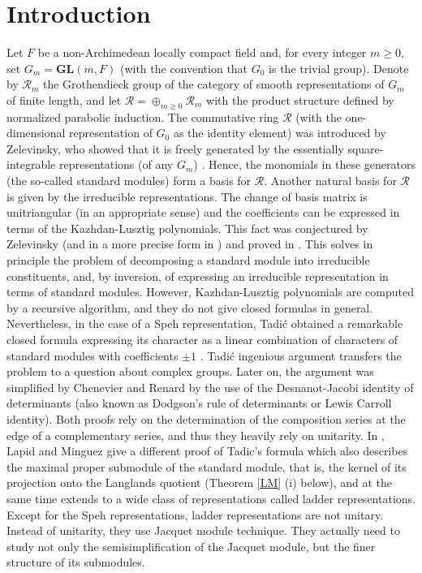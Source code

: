 \documentclass[a4paper,12pt,leqno]{amsart}
\newcommand{\caR}{\mathcal{R}}
\theoremstyle{plain}
\theoremstyle{definition}
\theoremstyle{definition}
\newcommand{\GL}{\mathbf{GL}}
\begin{document}
\section*{ Introduction}
Let $F$ be a non-Archimedean locally compact  field and, for every integer $m\geq0$, set $G_m=\GL(m,F)$
(with the convention that $G_0$  is the trivial group). Denote by $\caR_m$ the Grothendieck group
of the category of
 smooth representations of $G_m$  of  finite length, and let $\caR=\oplus_{m\geq 0}\caR_m$ with the
 product structure
 defined by normalized  parabolic induction. The commutative ring $\caR$  (with the one-dimensional
 representation
 of $G_0$ as the identity element) was introduced by Zelevinsky, who showed that it is freely generated by the
 essentially square-integrable representations   (of any $G_m$) \cite{Zel80}. Hence, the monomials in these
generators (the so-called standard modules) form a basis for   $\caR$. Another natural basis for $\caR$ is
given by the irreducible representations. The change of basis matrix is unitriangular (in an
appropriate sense)
 and the coefficients can be expressed in terms of the Kazhdan-Lusztig polynomials.
This fact was conjectured by Zelevinsky \cite{Zel81} (and in a more precise form in \cite{Zel85})
and proved in \cite{CG97}.
 This solves in principle the problem of decomposing a standard module into irreducible constituents, 
 and, by inversion, of expressing an irreducible representation in terms of standard modules.
 However, Kazhdan-Lusztig 
 polynomials are computed by a recursive algorithm, and they do not give closed formulas in
 general. Nevertheless, 
 in the case of a Speh representation, Tadi\'c obtained a remarkable closed  formula expressing its character 
 as a linear combination of characters of standard modules with coefficients $\pm1$  \cite{Tad95}.  
 Tadi\' c ingenious argument transfers the problem to a question about complex
 groups. Later on, the argument was  simplified by Chenevier and Renard \cite{CR08} by the use of
 the Desnanot-Jacobi
identity  of determinants (also known as Dodgson's rule of determinants or Lewis Carroll identity).
Both proofs rely on the
determination of the composition series at the edge of a complementary series, and thus they
heavily rely on unitarity.
In \cite{LM13}, Lapid and Minguez give a different proof of Tadic's formula
which also describes the maximal proper submodule of the standard module, that is, the kernel of
its projection onto the Langlands quotient (Theorem \ref{LM} (i) below), and at the same time
extends to a wide class of representations called ladder  representations.
Except for the Speh representations, ladder representations are not unitary. Instead of
unitarity, they use Jacquet module technique. They actually need to  study not only the
semisimplification of the Jacquet
module, but the finer structure of its submodules.
\end{document}
